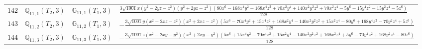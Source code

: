 \documentclass[fleqn,8pt,landscape]{jsarticle}
\begin{document}
\begin{table}[ht!]
\begin{center}
\begin{tabular}{cccl}
$ 142 $ & $ \mathbb{Q}_{11,1}(T_{2},3) $ & $ \mathbb{G}_{11,1}(T_{1},3) $ & $ \frac{3 \sqrt{1001} x \left(y^{2} - 2 y z - z^{2}\right) \left(y^{2} + 2 y z - z^{2}\right) \left(80 x^{6} - 168 x^{4} y^{2} - 168 x^{4} z^{2} + 70 x^{2} y^{4} + 140 x^{2} y^{2} z^{2} + 70 x^{2} z^{4} - 5 y^{6} - 15 y^{4} z^{2} - 15 y^{2} z^{4} - 5 z^{6}\right)}{128} $ \\
$ 143 $ & $ \mathbb{Q}_{11,2}(T_{2},3) $ & $ \mathbb{G}_{11,2}(T_{1},3) $ & $ - \frac{3 \sqrt{1001} y \left(x^{2} - 2 x z - z^{2}\right) \left(x^{2} + 2 x z - z^{2}\right) \left(5 x^{6} - 70 x^{4} y^{2} + 15 x^{4} z^{2} + 168 x^{2} y^{4} - 140 x^{2} y^{2} z^{2} + 15 x^{2} z^{4} - 80 y^{6} + 168 y^{4} z^{2} - 70 y^{2} z^{4} + 5 z^{6}\right)}{128} $ \\
$ 144 $ & $ \mathbb{Q}_{11,3}(T_{2},3) $ & $ \mathbb{G}_{11,3}(T_{1},3) $ & $ - \frac{3 \sqrt{1001} z \left(x^{2} - 2 x y - y^{2}\right) \left(x^{2} + 2 x y - y^{2}\right) \left(5 x^{6} + 15 x^{4} y^{2} - 70 x^{4} z^{2} + 15 x^{2} y^{4} - 140 x^{2} y^{2} z^{2} + 168 x^{2} z^{4} + 5 y^{6} - 70 y^{4} z^{2} + 168 y^{2} z^{4} - 80 z^{6}\right)}{128} $ \\
 \hline \hline
\end{tabular}
\end{center}
\end{table}
\end{document}
